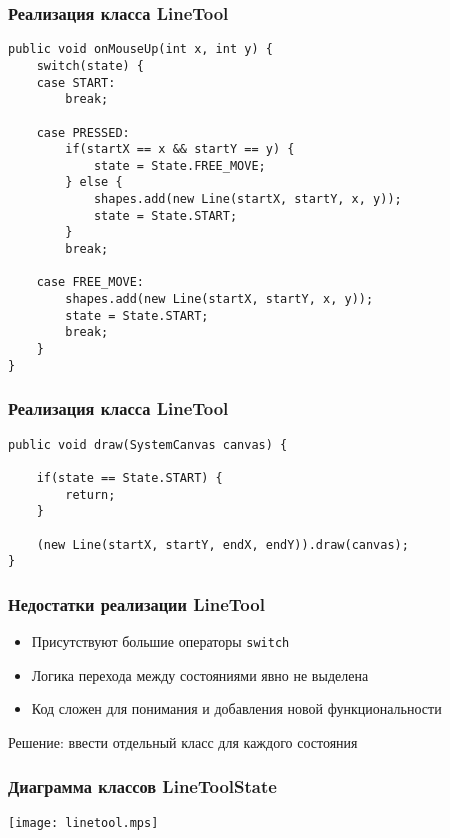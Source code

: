 \documentclass[handout]{beamer}
\begin{document}
\begin{frame}[fragile]
\frametitle{Реализация класса LineTool}
\begin{lstlisting}
public void onMouseUp(int x, int y) {
    switch(state) {
    case START:
        break;

    case PRESSED:
        if(startX == x && startY == y) {
            state = State.FREE_MOVE;
        } else {
            shapes.add(new Line(startX, startY, x, y));
            state = State.START;
        }
        break;

    case FREE_MOVE:
        shapes.add(new Line(startX, startY, x, y));
        state = State.START;
        break;
    }
}
\end{lstlisting}
\end{frame}


\begin{frame}[fragile]
\frametitle{Реализация класса LineTool}
\begin{lstlisting}
public void draw(SystemCanvas canvas) {

    if(state == State.START) {
        return;
    }

    (new Line(startX, startY, endX, endY)).draw(canvas);
}
\end{lstlisting}
\end{frame}


\begin{frame}[fragile]
\frametitle{Недостатки реализации LineTool}
\begin{itemize}
\item Присутствуют большие операторы \lstinline{switch}
\item Логика перехода между состояниями явно не выделена
\item Код сложен для понимания и добавления новой функциональности
\end{itemize}
\end{frame}


\begin{frame}[fragile]
\begin{center}
Решение: ввести отдельный класс для каждого состояния
\end{center}
\end{frame}


\begin{frame}[fragile]
\frametitle{Диаграмма классов LineToolState}
\begin{center}
\texttt{[image: linetool.mps]}
\end{center}
\end{frame}
\end{document}
